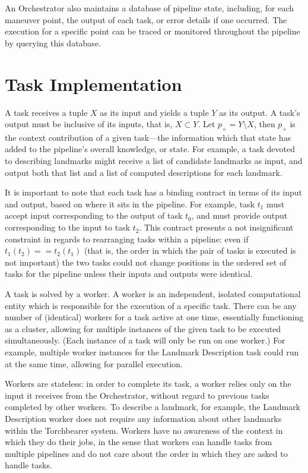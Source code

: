 An Orchestrator also maintains a database of pipeline state, including, for each maneuver point, the output of each task, or error details if one occurred. The execution for a specific point can be traced or monitored throughout the pipeline by querying this database.

\section{Task Implementation}\label{sec:arch:pipeline_imp}
A task receives a tuple $X$ as its input and yields a tuple $Y$ as its output. A task’s output must be inclusive of its inputs, that is, $X \subset Y$. Let $p_+ = Y \setminus X$, then $p_+$ is the context contribution of a given task---the information which that state has added to the pipeline's overall knowledge, or state. For example, a task devoted to describing landmarks might receive a list of candidate landmarks as input, and output both that list and a list of computed descriptions for each landmark.

It is important to note that each task has a binding contract in terms of its input and output, based on where it sits in the pipeline. For example, task $t_1$ must accept input corresponding to the output of task $t_0$, and must provide output corresponding to the input to task $t_2$. This contract presents a not insignificant constraint in regards to rearranging tasks within a pipeline: even if $t_1(t_2) == t_2(t_1)$ (that is, the order in which the pair of tasks is executed is not important) the two tasks could not change positions in the ordered set of tasks for the pipeline unless their inputs and outputs were identical. 

A task is solved by a worker. A worker is an independent, isolated computational entity which is responsible for the execution of a specific task. There can be any number of (identical) workers for a task active at one time, essentially functioning as a cluster, allowing for multiple instances of the given task to be executed simultaneously. (Each instance of a task will only be run on one worker.) For example, multiple worker instances for the Landmark Description task could run at the same time, allowing for parallel execution.

Workers are stateless: in order to complete its task, a worker relies only on the input it receives from the Orchestrator, without regard to previous tasks completed by other workers. To describe a landmark, for example, the Landmark Description worker does not require any information about other landmarks within the Torchbearer system.  Workers have no awareness of the context in which they do their jobs, in the sense that workers can handle tasks from multiple pipelines and do not care about the order in which they are asked to handle tasks. 


